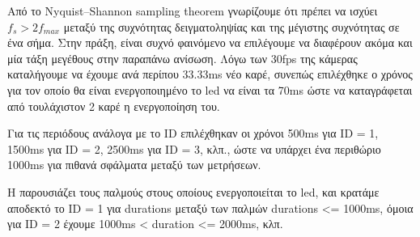 Από το Nyquist–Shannon sampling theorem γνωρίζουμε ότι πρέπει να ισχύει $f_s > 2f_{max}$ μεταξύ της συχνότητας δειγματοληψίας και της μέγιστης συχνότητας σε ένα σήμα. Στην πράξη, είναι συχνό φαινόμενο να επιλέγουμε να διαφέρουν ακόμα και μία τάξη μεγέθους στην παραπάνω ανίσωση. Λόγω των 30fps της κάμερας καταλήγουμε να έχουμε ανά περίπου 33.33ms νέο καρέ, συνεπώς επιλέχθηκε ο χρόνος για τον οποίο θα είναι ενεργοποιημένο το led να είναι τα 70ms ώστε να καταγράφεται από τουλάχιστον 2 καρέ η ενεργοποίηση του. 

Για τις περιόδους ανάλογα με το ID επιλέχθηκαν οι χρόνοι 500ms για ID = 1, 1500ms για ID = 2, 2500ms για ID = 3, κλπ., ώστε να υπάρχει ένα περιθώριο 1000ms για πιθανά σφάλματα μεταξύ των μετρήσεων. 

Η  παρουσιάζει τους παλμούς στους οποίους ενεργοποιείται το led, και κρατάμε αποδεκτό το ID = 1 για durations μεταξύ των παλμών durations <= 1000ms, όμοια για ID = 2 έχουμε 1000ms < duration <= 2000ms, κλπ.


